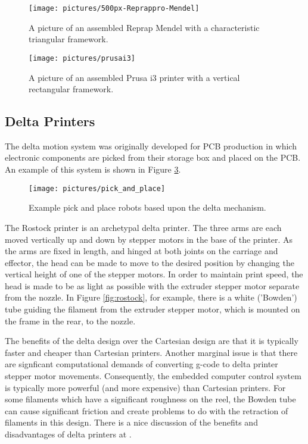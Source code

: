 \begin{figure}
\centering
\texttt{[image: pictures/500px-Reprappro-Mendel]}
\caption{A picture of an assembled Reprap Mendel with a characteristic triangular framework.}
\label{fig:500px-Reprappro-Mendel}
\end{figure}

\begin{figure}
\centering
\texttt{[image: pictures/prusai3]}
\caption{A picture of an assembled Prusa i3 printer with a vertical rectangular framework.}
\label{fig:prusai3}
\end{figure}

\subsection{Delta Printers}

The delta motion system was originally developed for PCB production in which electronic components are picked from their storage box and placed on the PCB. An example of this system is shown in Figure \ref{fig:pick_and_place}.  

\begin{figure}
\centering
\texttt{[image: pictures/pick\_and\_place]}
\caption{Example pick and place robots based upon the delta mechanism. }
\label{fig:pick_and_place}
\end{figure}

The Rostock printer is an archetypal delta printer. The three arms are each moved vertically up and down by stepper motors in the base of the printer. As the arms are fixed in length, and hinged at both joints on the carriage and effector, the head can be made to move to the desired position by changing the vertical height of one of the stepper motors. In order to maintain print speed, the head is made to be as light as possible with the extruder stepper motor separate from the nozzle. In Figure \ref{fig:rostock}, for example, there is a white ('Bowden') tube guiding the filament from the extruder stepper motor, which is mounted on the frame in the rear, to the nozzle. 

The benefits of the delta design over the Cartesian design are that it is typically faster and cheaper than Cartesian printers. Another marginal issue is that there are signficant computational demands of converting g-code to delta printer stepper motor movements. Consequently, the embedded computer control system is typically more powerful (and more expensive) than Cartesian printers. For some filaments which have a significant roughness on the reel, the Bowden tube can cause significant friction and create problems to do with the retraction of filaments in this design. There is a nice discussion of the benefits and disadvantages of delta printers at \cite{delta_url}. 


